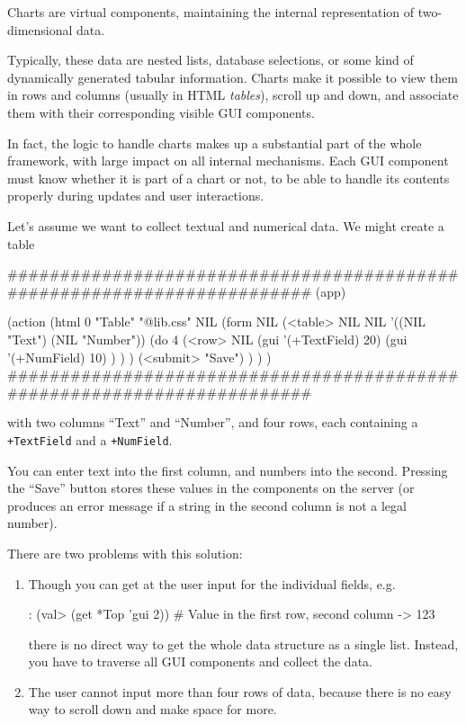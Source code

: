 Charts are virtual components, maintaining the internal representation
of two-dimensional data.

Typically, these data are nested lists, database selections, or some
kind of dynamically generated tabular information. Charts make it
possible to view them in rows and columns (usually in HTML
\emph{tables}), scroll up and down, and associate them with their
corresponding visible GUI components.

In fact, the logic to handle charts makes up a substantial part of the
whole framework, with large impact on all internal mechanisms. Each GUI
component must know whether it is part of a chart or not, to be able to
handle its contents properly during updates and user interactions.

Let's assume we want to collect textual and numerical data. We might
create a table


\begin{wideverbatim}
########################################################################
(app)

(action
   (html 0 "Table" "@lib.css" NIL
      (form NIL
         (<table> NIL NIL '((NIL "Text") (NIL "Number"))
            (do 4
               (<row> NIL
                  (gui '(+TextField) 20)
                  (gui '(+NumField) 10) ) ) )
         (<submit> "Save") ) ) )
########################################################################
\end{wideverbatim}

with two columns ``Text'' and ``Number'', and four rows, each containing a
\texttt{+TextField} and a \texttt{+NumField}.

You can enter text into the first column, and numbers into the second.
Pressing the ``Save'' button stores these values in the components on the
server (or produces an error message if a string in the second column is
not a legal number).

There are two problems with this solution:

\begin{enumerate}
\item Though you can get at the user input for the individual fields, e.g.


\begin{wideverbatim}
: (val> (get *Top 'gui 2))  # Value in the first row, second column
-> 123
\end{wideverbatim}

   there is no direct way to get the whole data structure as a single
   list. Instead, you have to traverse all GUI components and collect
   the data.
\item The user cannot input more than four rows of data, because there is
   no easy way to scroll down and make space for more.
\end{enumerate}

